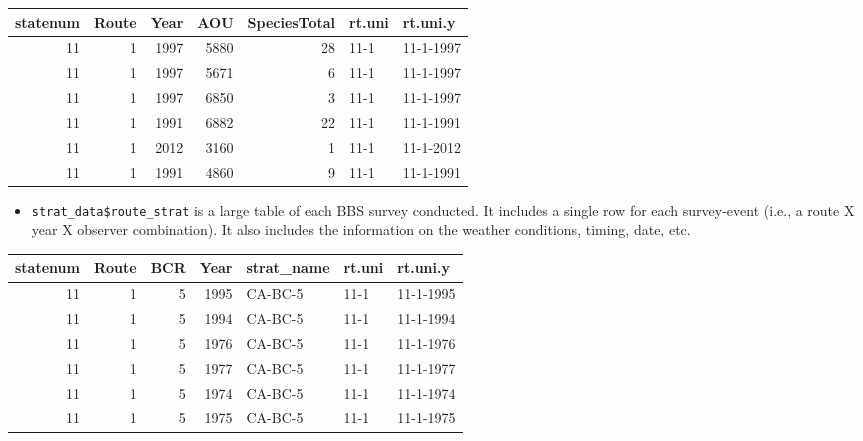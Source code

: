 \documentclass[
]{book}
\newenvironment{Shaded}{\begin{snugshade}}{\end{snugshade}}
\newcommand{\DecValTok}[1]{\textcolor[rgb]{0.00,0.00,0.81}{#1}}
\newcommand{\FunctionTok}[1]{\textcolor[rgb]{0.00,0.00,0.00}{#1}}
\newcommand{\NormalTok}[1]{#1}
\newcommand{\SpecialCharTok}[1]{\textcolor[rgb]{0.00,0.00,0.00}{#1}}
\providecommand{\tightlist}{%
  \setlength{\itemsep}{0pt}\setlength{\parskip}{0pt}}
\begin{document}
\begin{tabular}{r|r|r|r|r|l|l}
\hline
statenum & Route & Year & AOU & SpeciesTotal & rt.uni & rt.uni.y\\
\hline
11 & 1 & 1997 & 5880 & 28 & 11-1 & 11-1-1997\\
\hline
11 & 1 & 1997 & 5671 & 6 & 11-1 & 11-1-1997\\
\hline
11 & 1 & 1997 & 6850 & 3 & 11-1 & 11-1-1997\\
\hline
11 & 1 & 1991 & 6882 & 22 & 11-1 & 11-1-1991\\
\hline
11 & 1 & 2012 & 3160 & 1 & 11-1 & 11-1-2012\\
\hline
11 & 1 & 1991 & 4860 & 9 & 11-1 & 11-1-1991\\
\hline
\end{tabular}

\begin{itemize}
\tightlist
\item
  \texttt{strat\_data\$route\_strat} is a large table of each BBS survey conducted. It includes a single row for each survey-event (i.e., a route X year X observer combination). It also includes the information on the weather conditions, timing, date, etc.
\end{itemize}

\begin{Shaded}
\end{Shaded}

\begin{tabular}{r|r|r|r|l|l|l}
\hline
statenum & Route & BCR & Year & strat\_name & rt.uni & rt.uni.y\\
\hline
11 & 1 & 5 & 1995 & CA-BC-5 & 11-1 & 11-1-1995\\
\hline
11 & 1 & 5 & 1994 & CA-BC-5 & 11-1 & 11-1-1994\\
\hline
11 & 1 & 5 & 1976 & CA-BC-5 & 11-1 & 11-1-1976\\
\hline
11 & 1 & 5 & 1977 & CA-BC-5 & 11-1 & 11-1-1977\\
\hline
11 & 1 & 5 & 1974 & CA-BC-5 & 11-1 & 11-1-1974\\
\hline
11 & 1 & 5 & 1975 & CA-BC-5 & 11-1 & 11-1-1975\\
\hline
\end{tabular}
\end{document}
